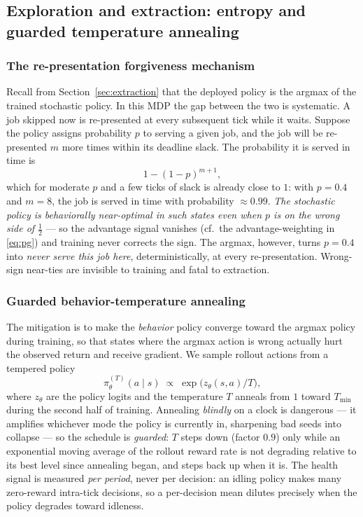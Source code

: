 \documentclass[11pt,a4paper]{article}
\begin{document}
\subsection{Exploration and extraction: entropy and guarded
temperature annealing}
\label{sec:anneal}

\subsubsection{The re-presentation forgiveness mechanism}
\label{sec:forgiveness}

Recall from Section~\ref{sec:extraction} that the deployed policy is the
argmax of the trained stochastic policy.  In this MDP the gap between
the two is systematic.  A job skipped now is re-presented at every
subsequent tick while it waits.  Suppose the policy assigns probability
$p$ to serving a given job, and the job will be re-presented $m$ more
times within its deadline slack.  The probability it is served in time
is
\begin{equation}
  1 - (1-p)^{m+1},
\end{equation}
which for moderate $p$ and a few ticks of slack is already close to
$1$: with $p = 0.4$ and $m = 8$, the job is served in time with
probability ${\approx}0.99$.  \emph{The stochastic policy is
behaviorally near-optimal in such states even when $p$ is on the wrong
side of $\tfrac12$} --- so the advantage signal vanishes
(cf.\ the advantage-weighting in \eqref{eq:pg}) and training never
corrects the sign.  The argmax, however, turns $p = 0.4$ into
\emph{never serve this job here}, deterministically, at every
re-presentation.  Wrong-sign near-ties are invisible to training and
fatal to extraction.

\subsubsection{Guarded behavior-temperature annealing}

The mitigation is to make the \emph{behavior} policy converge toward the
argmax policy during training, so that states where the argmax action is
wrong actually hurt the observed return and receive gradient.  We sample
rollout actions from a tempered policy
\begin{equation}
  \pi^{(T)}_\theta(a \mid s) \;\propto\;
  \exp\bigl(z_\theta(s,a)/T\bigr),
\end{equation}
where $z_\theta$ are the policy logits and the temperature $T$ anneals
from $1$ toward $T_{\min}$ during the second half of training.
Annealing \emph{blindly} on a clock is dangerous --- it amplifies
whichever mode the policy is currently in, sharpening bad seeds into
collapse --- so the schedule is \emph{guarded}: $T$ steps down (factor
$0.9$) only while an exponential moving average of the rollout reward
rate is not degrading relative to its best level since annealing began,
and steps back up when it is.  The health signal is measured
\emph{per period}, never per decision: an idling policy makes many
zero-reward intra-tick decisions, so a per-decision mean dilutes
precisely when the policy degrades toward idleness.
\end{document}
